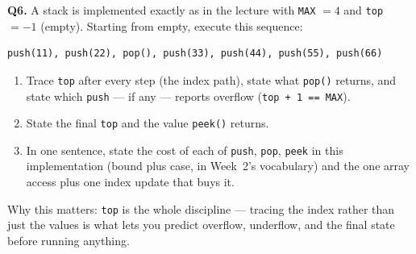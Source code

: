 \documentclass[11pt]{article}
\begin{document}
\textbf{Q6.} A stack is implemented exactly as in the lecture with \texttt{MAX} $= 4$ and \texttt{top} $= -1$ (empty). Starting from empty, execute this sequence:
\begin{verbatim}
push(11), push(22), pop(), push(33), push(44), push(55), push(66)
\end{verbatim}
\begin{enumerate}
  \item[(a)] Trace \texttt{top} after every step (the index path), state what \texttt{pop()} returns, and state which \texttt{push} --- if any --- reports overflow (\texttt{top + 1 == MAX}).
  \item[(b)] State the final \texttt{top} and the value \texttt{peek()} returns.
  \item[(c)] In one sentence, state the cost of each of \texttt{push}, \texttt{pop}, \texttt{peek} in this implementation (bound plus case, in Week~2's vocabulary) and the one array access plus one index update that buys it.
\end{enumerate}
Why this matters: \texttt{top} is the whole discipline --- tracing the index rather than just the values is what lets you predict overflow, underflow, and the final state before running anything.



\end{document}

